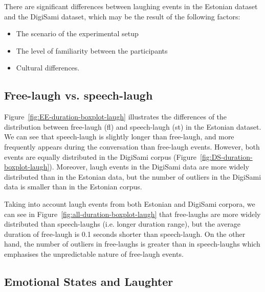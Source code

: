 \documentclass[10pt,journal,compsoc]{IEEEtran}
\begin{document}
There are significant differences between laughing events in the Estonian dataset and the DigiSami dataset, which may be the result of the following factors:
\begin{itemize}
\item The scenario of the experimental setup
\item The level of familiarity between the participants
\item Cultural differences.
\end{itemize}

\subsection{Free-laugh vs. speech-laugh}


Figure~\ref{fig:EE-duration-boxplot-laugh} illustrates the differences of the distribution between free-laugh (fl) and speech-laugh (st) in the Estonian dataset. We can see that speech-laugh is slightly longer than free-laugh, and more frequently appears during the conversation than free-laugh events.
However, both events are equally distributed in the DigiSami corpus (Figure~\ref{fig:DS-duration-boxplot-laugh}). Moreover, laugh events in the DigiSami data are more widely distributed than in the Estonian data, but the number of outliers in the DigiSami data is smaller than in the Estonian corpus.


Taking into account laugh events from both Estonian and DigiSami corpora, we can see in Figure~\ref{fig:all-duration-boxplot-laugh} that free-laughs are more widely distributed than speech-laughs (i.e. longer duration range), but the average duration of free-laugh is 0.1 seconds shorter than speech-laugh. On the other hand, the number of outliers in free-laughs is greater than in speech-laughs which emphasises the unpredictable nature of free-laugh events.

\subsection{Emotional States and Laughter }
\end{document}

